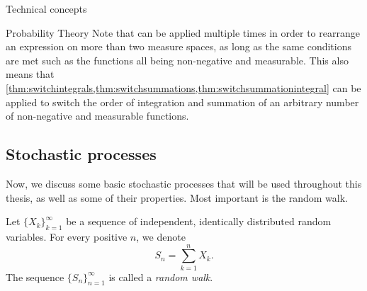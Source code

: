 \begin{section}{Technical concepts \label{sec:tc}}
\begin{subsection}{Probability Theory}
Note that  can be applied multiple times in order to rearrange an expression on more than two measure spaces, as long as the same conditions are met such as the functions all being non-negative and measurable. This also means that \cref{thm:switchintegrals,thm:switchsummations,thm:switchsummationintegral} can be applied to switch the order of integration and summation of an arbitrary number of non-negative and measurable functions.

\end{subsection}
\subsection{Stochastic processes}

Now, we discuss some basic stochastic processes that will be used throughout this thesis, as well as some of their properties.
Most important is the random walk.

\begin{definition}
	\label{def:tc:stochastic:randomwalk}
	Let $\{X_k\}_{k=1}^\infty$ be a sequence of independent, identically distributed random variables. For every positive $n$, we denote
	\begin{equation*}
	 S_n = \sum_{k=1}^n X_k.
	 \end{equation*}
	The sequence $\{S_n\}_{n=1}^\infty$ is called a \emph{random walk}.
\end{definition}


\end{section}
